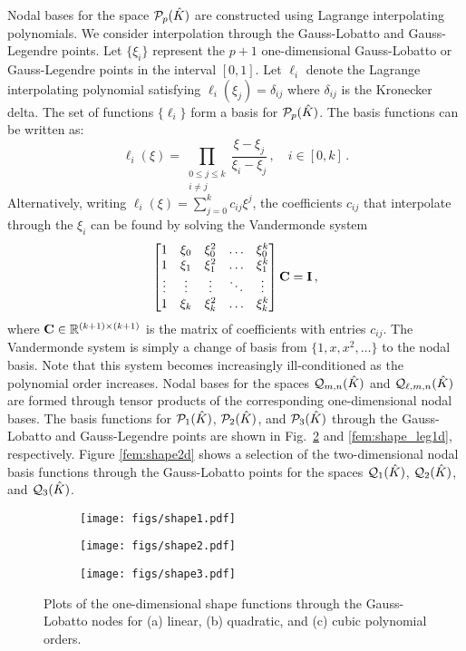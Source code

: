 \documentclass[../doc.tex]{subfiles}
\begin{document}
Nodal bases for the space $\mathcal{P}_{p}(\hat{K})$ are constructed using Lagrange interpolating polynomials. We consider interpolation through the Gauss-Lobatto and Gauss-Legendre points. Let $\{\xi_i\}$ represent the $p+1$ one-dimensional Gauss-Lobatto or Gauss-Legendre points in the interval $[0,1]$. Let $\ell_i$ denote the Lagrange interpolating polynomial satisfying $\ell_i(\xi_j) = \delta_{ij}$ where $\delta_{ij}$ is the Kronecker delta. The set of functions $\{\ell_i\}$ form a basis for $\mathcal{P}_{p}(\hat{K})$. The basis functions can be written as:  
	\begin{equation}
		\ell_i(\xi) = \prod_{\substack{0\leq j \leq k\\i\neq j}} \frac{\xi - \xi_j}{\xi_i - \xi_j} \,, \quad i \in [0,k] \,. 
	\end{equation}
Alternatively, writing $\ell_i(\xi) = \sum_{j=0}^k c_{ij} \xi^j$, the coefficients $c_{ij}$ that interpolate through the $\xi_i$ can be found by solving the Vandermonde system 
	\begin{equation}
		\begin{bmatrix} 
			1 & \xi_0 & \xi_0^2 & \ldots & \xi_0^k \\
			1 & \xi_{1} & \xi_{1}^2 & \ldots & \xi_{1}^k \\
			\vdots & \vdots & \vdots & \ddots & \vdots \\
			1 & \xi_{k} & \xi_{k}^2 & \ldots & \xi_{k}^k 
		\end{bmatrix}
		\boldsymbol{\mathrm{C}} = \boldsymbol{\mathrm{I}} \,,
	\end{equation}
where $\boldsymbol{\mathrm{C}} \in \mathbb{R}^{(k+1)\times(k+1)}$ is the matrix of coefficients with entries $c_{ij}$. The Vandermonde system is simply a change of basis from $\{1,x,x^2,\ldots\}$ to the nodal basis. Note that this system becomes increasingly ill-conditioned as the polynomial order increases. 
Nodal bases for the spaces $\mathcal{Q}_{m,n}(\hat{K})$ and $\mathcal{Q}_{\ell,m,n}(\hat{K})$ are formed through tensor products of the corresponding one-dimensional nodal bases.
The basis functions for $\mathcal{P}_{1}(\hat{K})$, $\mathcal{P}_{2}(\hat{K})$, and $\mathcal{P}_{3}(\hat{K})$ through the Gauss-Lobatto and Gauss-Legendre points are shown in Fig.~\ref{fem:shape1d} and \ref{fem:shape_leg1d}, respectively.  Figure \ref{fem:shape2d} shows a selection of the two-dimensional nodal basis functions through the Gauss-Lobatto points for the spaces $\mathcal{Q}_{1}(\hat{K})$, $\mathcal{Q}_{2}(\hat{K})$, and $\mathcal{Q}_{3}(\hat{K})$. 
\begin{figure}
\centering
\begin{subfigure}{.30\textwidth}
	\centering
	\texttt{[image: figs/shape1.pdf]}
	\caption{}
	\label{fem:shape1d_linear}
\end{subfigure}
\begin{subfigure}{.30\textwidth}
	\centering
	\texttt{[image: figs/shape2.pdf]}
	\caption{}
\end{subfigure}
\begin{subfigure}{.30\textwidth}
	\centering
	\texttt{[image: figs/shape3.pdf]}
	\caption{}
\end{subfigure}
\caption{Plots of the one-dimensional shape functions through the Gauss-Lobatto nodes for (a) linear, (b) quadratic, and (c) cubic polynomial orders.}
\label{fem:shape1d}
\end{figure}
\end{document}
